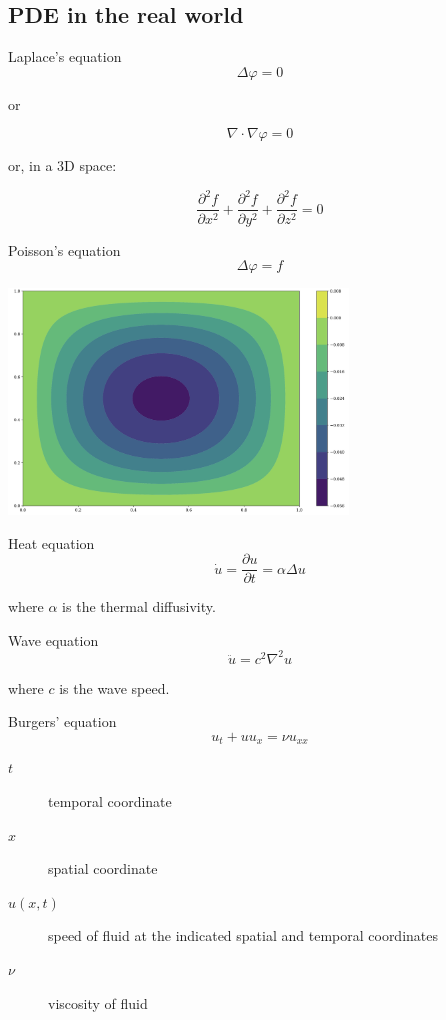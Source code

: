 \documentclass[aspectratio=1610,xcolor={dvipsnames},hyperref={colorlinks,unicode,linkcolor=violet,anchorcolor=BlueViolet,citecolor=YellowOrange,filecolor=black,urlcolor=Aquamarine}]{beamer}
\begin{document}
\subsection{PDE in the real world}
\label{sec:orgf4f6c34}

\begin{frame}[label={sec:orgffedd98}]{Laplace's equation}
\[\Delta \varphi = 0\]

or

\[\nabla \cdot \nabla \varphi = 0\]

or, in a 3D space:

\[\frac  {\partial ^{2}f}{\partial x^{2}}+\frac  {\partial ^{2}f}{\partial y^{2}}+\frac  {\partial ^{2}f}{\partial z^{2}} = 0\]
\end{frame}

\begin{frame}[label={sec:org5a0e218}]{Poisson's equation}
\[\Delta \varphi = f\]

\begin{center}
\includegraphics[height=6cm]{./p5.png}
\end{center}
\end{frame}

\begin{frame}[label={sec:org7e633e9}]{Heat equation}
\[\dot{u} = \frac  {\partial u}{\partial t} = \alpha \Delta u\]

where \(\alpha\) is the thermal diffusivity.
\end{frame}

\begin{frame}[label={sec:org77a7ad2}]{Wave equation}
\[\ddot {u}=c^{2}\nabla ^{2}u\]

where \(c\) is the wave speed.
\end{frame}

\begin{frame}[label={sec:orgea36be1}]{Burgers' equation}
\[u_t + u u_x = \nu u_{xx}\]

\begin{description}
\item[{\(t\)}] temporal coordinate
\item[{\(x\)}] spatial coordinate
\item[{\(u(x, t)\)}] speed of fluid at the indicated spatial and temporal coordinates
\item[{\(\nu\)}] viscosity of fluid
\end{description}
\end{frame}
\end{document}
